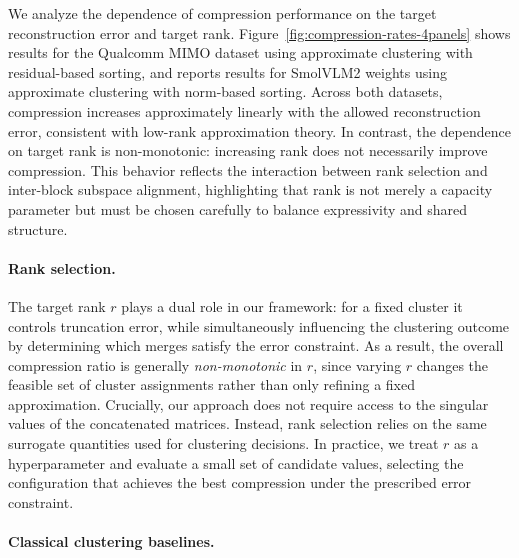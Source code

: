 \documentclass[10pt]{article} %
\begin{document}
We analyze the dependence of compression performance on the target reconstruction error and target rank.
Figure~\ref{fig:compression-rates-4panels} shows results for the Qualcomm MIMO dataset using approximate clustering with residual-based sorting, and reports results for SmolVLM2 weights using approximate clustering with norm-based sorting. Across both datasets, compression increases approximately linearly with the allowed reconstruction error, consistent with low-rank approximation theory.
In contrast, the dependence on target rank is non-monotonic: increasing rank does not necessarily improve compression.
This behavior reflects the interaction between rank selection and inter-block subspace alignment, highlighting that rank is not merely a capacity parameter but must be chosen carefully to balance expressivity and shared structure.

\paragraph{Rank selection.}
The target rank \( r \) plays a dual role in our framework: for a fixed cluster it controls truncation error, while simultaneously influencing the clustering outcome by determining which merges satisfy the error constraint. As a result, the overall compression ratio is generally \emph{non-monotonic} in \( r \), since varying \( r \) changes the feasible set of cluster assignments rather than only refining a fixed approximation.
Crucially, our approach does not require access to the singular values of the concatenated matrices. Instead, rank selection relies on the same surrogate quantities used for clustering decisions. In practice, we treat \( r \) as a hyperparameter and evaluate a small set of candidate values, selecting the configuration that achieves the best compression under the prescribed error constraint.


\paragraph{Classical clustering baselines.}
\end{document}
